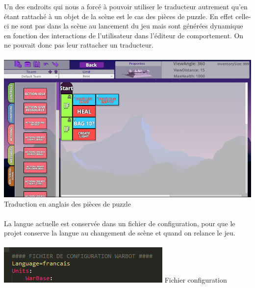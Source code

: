 \documentclass{report}
\begin{document}
Un des endroits qui nous a forcé à pouvoir utiliser le traducteur autrement qu’en étant rattaché à un objet de la scène est le cas des pièces de puzzle.
En effet celle-ci ne sont pas dans la scène au lancement du jeu mais sont générées dynamique en fonction des interactions de l’utilisateur dans l’éditeur de comportement. 
On ne pouvait donc pas leur rattacher un traducteur.

\paragraph{}
\begin{center}
\includegraphics[scale=0.5]{DATA/piecetrad.png}
 {Traduction en anglais des pièces de puzzle}
\end{center}
\paragraph{}


La langue actuelle est conservée dans un fichier de configuration, pour que le projet conserve la langue au changement de scène et quand on relance le jeu.

\paragraph{}
\begin{center}
\includegraphics[scale=0.9]{DATA/fichierconfig.png}
 {Fichier configuration}
\end{center}
\paragraph{}
\end{document}
